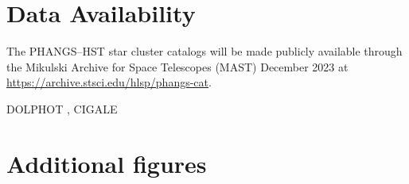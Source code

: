 \documentclass[linenumbers]{aastex63}
\begin{document}
{\section*{Data Availability}
The PHANGS--HST star cluster catalogs will be made publicly available through the Mikulski Archive for Space Telescopes (MAST) December 2023 at \url{https://archive.stsci.edu/hlsp/phangs-cat}.

{DOLPHOT \citep[v2.0][]{dolphin_dolphot_2016}, CIGALE \citep{burgarella_star_2005,noll_analysis_2009,boquien_cigale_2019}}

%
   
 

\clearpage


\section{Additional figures}\label{append:add_fig}
%
%
%

}
\end{document}
